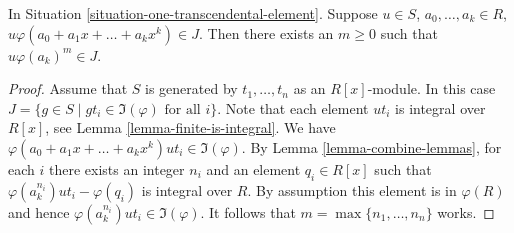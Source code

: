 \begin{lemma}
\label{lemma-leading-coefficient-in-J}
In Situation \ref{situation-one-transcendental-element}.
Suppose $u \in S$, $a_0, \ldots, a_k \in R$,
$u \varphi(a_0 + a_1x + \ldots + a_k x^k) \in J$.
Then there exists an $m \geq 0$ such that
$u \varphi(a_k)^m \in J$.
\end{lemma}

\begin{proof}
Assume that $S$ is generated by $t_1, \ldots, t_n$
as an $R[x]$-module. In this case
$J = \{ g \in S \mid gt_i \in \Im(\varphi)\text{ for all }i\}$.
Note that each element $u t_i$ is integral over
$R[x]$, see Lemma \ref{lemma-finite-is-integral}.
We have $\varphi(a_0 + a_1x + \ldots + a_k x^k) u t_i \in
\Im(\varphi)$. By Lemma \ref{lemma-combine-lemmas}, for
each $i$ there exists an integer $n_i$ and an element
$q_i \in R[x]$ such that $\varphi(a_k^{n_i}) u t_i - \varphi(q_i)$
is integral over $R$. By assumption this element is in $\varphi(R)$
and hence $\varphi(a_k^{n_i}) u t_i \in \Im(\varphi)$.
It follows that $m = \max\{n_1, \ldots, n_n\}$ works.
\end{proof}
